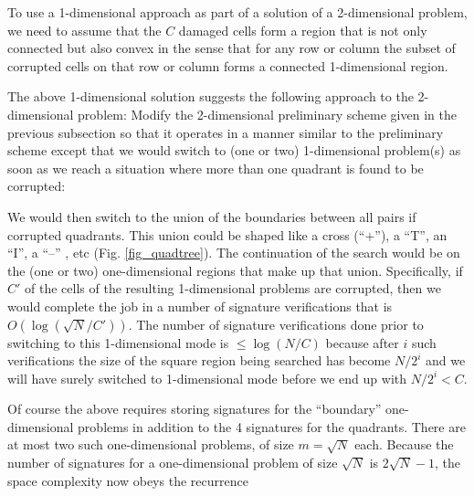 \documentclass{llncs}
\begin{document}
To use a 1-dimensional approach as part of
a solution of a 2-dimensional problem, we need
to assume that the $C$ damaged cells form a region 
that is not only connected but also convex
in the sense that for any row or column the 
subset of corrupted cells on that row or 
column forms a connected 1-dimensional region.

The above 1-dimensional solution suggests the 
following approach to the 2-dimensional problem:
Modify the 2-dimensional preliminary scheme
given in the previous subsection 
so that it operates in a manner
similar to the preliminary scheme except that 
we would switch to (one or two) 1-dimensional problem(s)
as soon as we reach a situation where more than 
one quadrant is found to be corrupted: 

\begin{figure*}
\centerline{\subfigure[``$+$'' Boundary]{\texttt{[image: 1234]}
\label{fig_improve_a}}
\hfil
\subfigure[``T'' Boundary]{\texttt{[image: 123]}
\label{fig_improve_b}}
\hfil
\subfigure[``I'' Boundary]{\texttt{[image: 34]}
\label{fig_improve_c}}}
\caption{Improved Scheme}
\label{fig_quadtree}
\end{figure*}

We would then switch to the union of the 
boundaries between all pairs if corrupted 
quadrants.  This union could be shaped like 
a cross (``$+$''), a ``T'', 
an ``I'', a ``--'' , etc (Fig. \ref{fig_quadtree}).  The continuation
of the search would be on the (one or two) one-dimensional
regions that make up that union. Specifically,
if $C'$ of the cells of the resulting 1-dimensional
problems are corrupted, then we would
complete the job in a number of signature
verifications that is $O( \log ( \sqrt{N} / C' ) )$.
The number of signature verifications done
prior to switching to this 1-dimensional mode
is $\leq \log ( N / C )$ because after
$i$ such verifications the size of the square
region being searched has become $N / 2^i$
and we will have surely switched to 1-dimensional
mode before we end up with $N / 2^i < C$.

Of course the above requires storing signatures
for the ``boundary'' one-dimensional problems in
addition to the 4 signatures for the quadrants.
There are at most two such one-dimensional
problems, of size $m = \sqrt{N}$ each.
Because the number of signatures for a one-dimensional 
problem of size $\sqrt{N}$ is $2 \sqrt{N} - 1$,
the space complexity now obeys the recurrence
\end{document}
